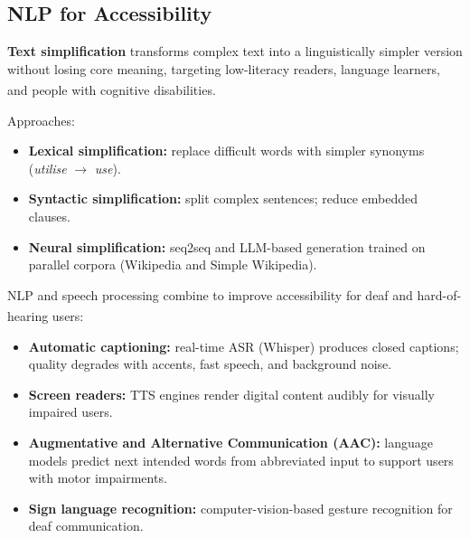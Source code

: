 \subsection{NLP for Accessibility}

\begin{tcbitemize}[ skin=sectionraster ]

    \tcbitem[title=Text Simplification, raster multicolumn=3]
    \textbf{Text simplification} transforms complex text into a linguistically simpler
    version without losing core meaning, targeting low-literacy readers, language
    learners, and people with cognitive
    disabilities.\textsuperscript{\cite[][p.~11]{dhamaniIntroductionGenerativeAI2024}}

    Approaches:
    \begin{itemize}
        \item \textbf{Lexical simplification:} replace difficult words with simpler
              synonyms (\emph{utilise} $\to$ \emph{use}).
        \item \textbf{Syntactic simplification:} split complex sentences; reduce
              embedded clauses.
        \item \textbf{Neural simplification:} seq2seq and LLM-based generation trained
              on parallel corpora (Wikipedia and Simple Wikipedia).
    \end{itemize}

    \tcbitem[title={Captioning and Speech Accessibility}, raster multicolumn=3]
    NLP and speech processing combine to improve accessibility for deaf and hard-of-hearing
    users:\textsuperscript{\cite[][p.~11]{dhamaniIntroductionGenerativeAI2024}}

    \begin{itemize}
        \item \textbf{Automatic captioning:} real-time ASR (Whisper) produces closed
              captions; quality degrades with accents, fast speech, and background noise.
        \item \textbf{Screen readers:} TTS engines render digital content audibly for
              visually impaired users.
        \item \textbf{Augmentative and Alternative Communication (AAC):} language models
              predict next intended words from abbreviated input to support users with
              motor impairments.
        \item \textbf{Sign language recognition:} computer-vision-based gesture
              recognition for deaf communication.
    \end{itemize}

\end{tcbitemize}


